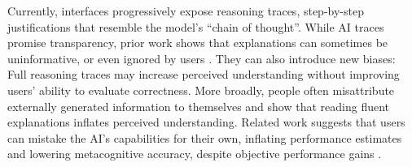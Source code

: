 \documentclass[acmlarge,review=true, anonymous=true]{acmart}
\begin{document}
Currently, interfaces progressively expose reasoning traces, step-by-step justifications that resemble the model’s ``chain of thought''. While AI traces promise transparency, prior work shows that explanations can sometimes be uninformative, or even ignored by users \cite{vasconcelos2023explanations}. They can also introduce new biases: Full reasoning traces may increase perceived understanding without improving users' ability to evaluate correctness. More broadly, people often misattribute externally generated information to themselves \cite{johnson_source_1993}  and \citet{fisher2021harder} show that reading fluent explanations inflates perceived understanding. Related work suggests that users can mistake the AI's capabilities for their own, inflating performance estimates and lowering metacognitive accuracy, despite objective performance gains \cite{tankelevitch2023metacognitive, fleming2024metacognition, fisher2021harder}.

\end{document}
